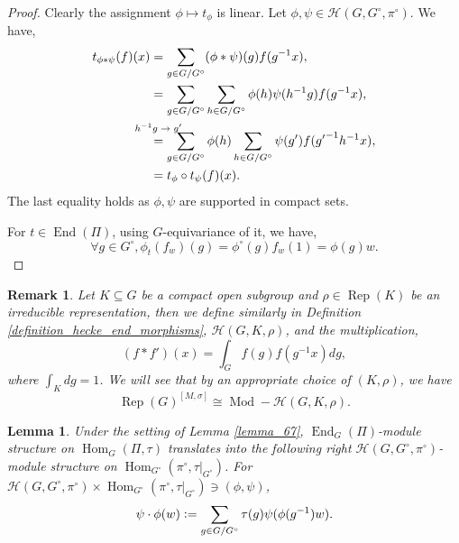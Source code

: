 \documentclass[8pt]{article}
\newtheorem{lemma}{Lemma}[section]
\newtheorem{remark}{Remark}[section]
\DeclareMathOperator{\Rep}{Rep}
\DeclareMathOperator{\Hom}{Hom}
\DeclareMathOperator{\End}{End}
\DeclareMathOperator{\Mod}{Mod}
\newcommand{\defeq}{\vcentcolon=}
\newcommand{\hecke}[0]{\mathscr{H}}
\begin{document}
\begin{proof}
  Clearly the assignment $\phi\mapsto t_\phi$ is linear. Let $\phi,\psi\in\hecke(G,G^\circ,\pi^\circ)$. We have,
  \begin{align*}
    t_{\phi\ast\psi}(f)(x) & = \sum_{g\in G/G^\circ}(\phi\ast\psi)(g)f(g^{-1}x),\\
    & = \sum_{g\in G/G^\circ}\sum_{h\in G/G^\circ}\phi(h)\psi(h^{-1}g)f(g^{-1}x),\\
    & \stackrel{\substack{\text{\makebox[0pt][c]{$h^{-1}g\to g'$}}\\\:}}{=}\sum_{g\in G/G^\circ}\phi(h)\sum_{h\in G/G^\circ}\psi(g')f({g'}^{-1}h^{-1}x),\\
    & = t_\phi\circ t_\psi(f)(x).
  \end{align*}
  The last equality holds as $\phi,\psi$ are supported in compact sets.
  \par For $t\in\End(\Pi)$, using $G$-equivariance of it, we have,
  \begin{equation*}
    \forall g\in G^\circ,\phi_t(f_w)(g) = \phi^\circ(g)f_w(1) = \phi(g)w. 
  \end{equation*}
\end{proof}
\begin{remark}
  Let $K\subseteq G$ be a compact open subgroup and $\rho\in\Rep(K)$ be an irreducible representation, then we define similarly in Definition \ref{definition_hecke_end_morphisms}, $\hecke(G,K,\rho)$, and the multiplication,
  \begin{equation*}
    (f\ast f')(x) = \int_Gf(g)f(g^{-1}x)dg,
  \end{equation*}
  where $\int_K dg = 1$. We will see that by an appropriate choice of $(K,\rho)$, we have 
  \begin{equation*}
    \Rep(G)^{[M,\sigma]}\cong \Mod-\hecke(G,K,\rho).
  \end{equation*}
\end{remark}
\begin{lemma}
  \label{lemma_68}
  Under the setting of Lemma \ref{lemma_67}, $\End_G(\Pi)$-module structure on $\Hom_G(\Pi,\tau)$ translates into the following right $\hecke(G,G^\circ,\pi^\circ)$-module structure on $\Hom_{G^\circ}(\pi^\circ,\tau|_{G^\circ})$. For $\hecke(G,G^\circ,\pi^\circ)\times\Hom_{G^\circ}(\pi^\circ,\tau|_{G^\circ})\ni (\phi,\psi)$,
  \begin{equation*}
   \psi\cdot\phi(w)\defeq \sum_{g\in G/G^\circ}\tau(g)\psi(\phi(g^{-1})w).
  \end{equation*}
\end{lemma}
\end{document}
